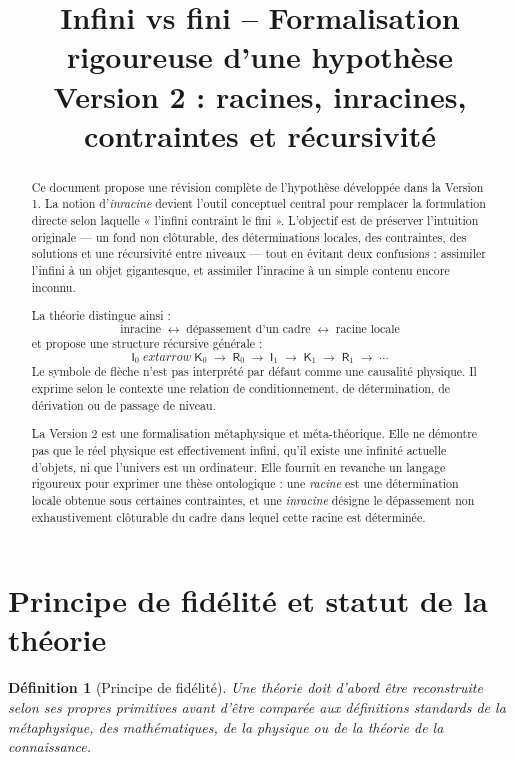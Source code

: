 \documentclass[11pt,a4paper]{article}
\title{\textbf{Infini vs fini -- Formalisation rigoureuse d'une hypothèse}\\
\large Version 2 : racines, inracines, contraintes et récursivité}
\author{}
\date{}
\newtheorem{definition}{Définition}[section]
\newcommand{\Rac}{\mathsf{R}}
\newcommand{\Inrac}{\mathsf{I}}
\newcommand{\Cadre}{\mathsf{K}}
\begin{document}
\maketitle

\begin{abstract}
Ce document propose une révision complète de l'hypothèse développée dans la
Version 1. La notion d'\emph{inracine} devient l'outil conceptuel central pour
remplacer la formulation directe selon laquelle « l'infini contraint le fini ».
L'objectif est de préserver l'intuition originale --- un fond non clôturable,
des déterminations locales, des contraintes, des solutions et une récursivité
entre niveaux --- tout en évitant deux confusions : assimiler l'infini à un
objet gigantesque, et assimiler l'inracine à un simple contenu encore inconnu.

La théorie distingue ainsi :
\[
\boxed{
\text{inracine}
\;\leftrightarrow\;
\text{dépassement d'un cadre}
\;\leftrightarrow\;
\text{racine locale}
}
\]
et propose une structure récursive générale :
\[
\boxed{
\Inrac_0\;
extarrow\;\Cadre_0\;\to\;\Rac_0\;\to\;
\Inrac_1\;\to\;\Cadre_1\;\to\;\Rac_1\;\to\;\cdots
}
\]
Le symbole de flèche n'est pas interprété par défaut comme une causalité
physique. Il exprime selon le contexte une relation de conditionnement,
de détermination, de dérivation ou de passage de niveau.

La Version 2 est une formalisation métaphysique et méta-théorique. Elle ne
démontre pas que le réel physique est effectivement infini, qu'il existe une
infinité actuelle d'objets, ni que l'univers est un ordinateur. Elle fournit en
revanche un langage rigoureux pour exprimer une thèse ontologique : une
\emph{racine} est une détermination locale obtenue sous certaines contraintes,
et une \emph{inracine} désigne le dépassement non exhaustivement clôturable du
cadre dans lequel cette racine est déterminée.
\end{abstract}

\section{Principe de fidélité et statut de la théorie}

\begin{definition}[Principe de fidélité]
Une théorie doit d'abord être reconstruite selon ses propres primitives avant
d'être comparée aux définitions standards de la métaphysique, des
mathématiques, de la physique ou de la théorie de la connaissance.
\end{definition}
\end{document}
